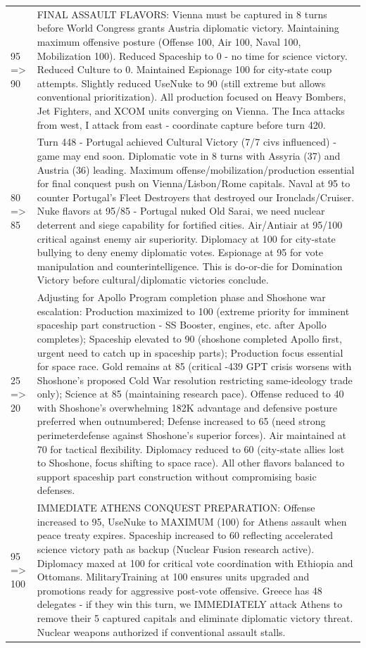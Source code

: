 \begin{longtable}{p{}p{}}
95 => 90 & FINAL ASSAULT FLAVORS: Vienna must be captured in 8 turns before World Congress grants Austria diplomatic victory. Maintaining maximum offensive posture (Offense 100, Air 100, Naval 100, Mobilization 100). Reduced Spaceship to 0 - no time for science victory. Reduced Culture to 0. Maintained Espionage 100 for city-state coup attempts. Slightly reduced UseNuke to 90 (still extreme but allows conventional prioritization). All production focused on Heavy Bombers, Jet Fighters, and XCOM units converging on Vienna. The Inca attacks from west, I attack from east - coordinate capture before turn 420. \\
80 => 85 & Turn 448 - Portugal achieved Cultural Victory (7/7 civs influenced) - game may end soon. Diplomatic vote in 8 turns with Assyria (37) and Austria (36) leading. Maximum offense/mobilization/production essential for final conquest push on Vienna/Lisbon/Rome capitals. Naval at 95 to counter Portugal's Fleet Destroyers that destroyed our Ironclads/Cruiser. Nuke flavors at 95/85 - Portugal nuked Old Sarai, we need nuclear deterrent and siege capability for fortified cities. Air/Antiair at 95/100 critical against enemy air superiority. Diplomacy at 100 for city-state bullying to deny enemy diplomatic votes. Espionage at 95 for vote manipulation and counterintelligence. This is do-or-die for Domination Victory before cultural/diplomatic victories conclude. \\
25 => 20 & Adjusting for Apollo Program completion phase and Shoshone war escalation: Production maximized to 100 (extreme priority for imminent spaceship part construction - SS Booster, engines, etc. after Apollo completes); Spaceship elevated to 90 (shoshone completed Apollo first, urgent need to catch up in spaceship parts); Production focus essential for space race. Gold remains at 85 (critical -439 GPT crisis worsens with Shoshone's proposed Cold War resolution restricting same-ideology trade only); Science at 85 (maintaining research pace). Offense reduced to 40 with Shoshone's overwhelming 182K advantage and defensive posture preferred when outnumbered; Defense increased to 65 (need strong perimeterdefense against Shoshone's superior forces). Air maintained at 70 for tactical flexibility. Diplomacy reduced to 60 (city-state allies lost to Shoshone, focus shifting to space race). All other flavors balanced to support spaceship part construction without compromising basic defenses. \\
95 => 100 & IMMEDIATE ATHENS CONQUEST PREPARATION: Offense increased to 95, UseNuke to MAXIMUM (100) for Athens assault when peace treaty expires. Spaceship increased to 60 reflecting accelerated science victory path as backup (Nuclear Fusion research active). Diplomacy maxed at 100 for critical vote coordination with Ethiopia and Ottomans. MilitaryTraining at 100 ensures units upgraded and promotions ready for aggressive post-vote offensive. Greece has 48 delegates - if they win this turn, we IMMEDIATELY attack Athens to remove their 5 captured capitals and eliminate diplomatic victory threat. Nuclear weapons authorized if conventional assault stalls. \\

\end{longtable}
